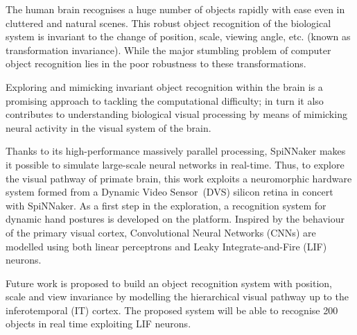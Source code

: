 %

%
%
%
%

%

The human brain recognises a huge number of objects rapidly with ease even in cluttered and natural scenes.
This robust object recognition of the biological system is invariant to the change of position, scale, viewing angle, etc. (known as transformation invariance).
While the major stumbling problem of computer object recognition lies in the poor robustness to these transformations.

Exploring and mimicking invariant object recognition within the brain is a promising approach to tackling the computational difficulty;
in turn it also contributes to understanding biological visual processing by means of mimicking neural activity in the visual system of the brain.

Thanks to its high-performance massively parallel processing, SpiNNaker makes it possible to simulate large-scale neural networks in real-time.
Thus, to explore the visual pathway of primate brain, this work exploits a neuromorphic hardware system formed from a Dynamic Video Sensor~(DVS) silicon retina in concert with SpiNNaker.
As a first step in the exploration, a recognition system for dynamic hand postures is developed on the platform.
Inspired by the behaviour of the primary visual cortex, Convolutional Neural Networks (CNNs) are modelled using both linear perceptrons and Leaky Integrate-and-Fire (LIF) neurons.

Future work is proposed to build an object recognition system with position, scale and view invariance by modelling the hierarchical visual pathway up to the inferotemporal (IT) cortex.
The proposed system will be able to recognise 200 objects in real time exploiting LIF neurons.

